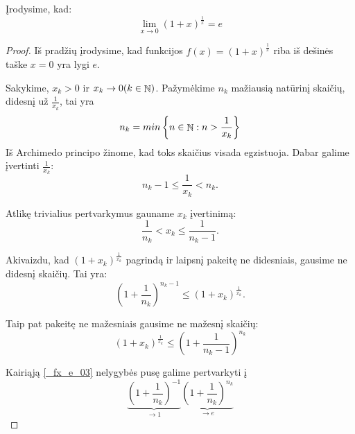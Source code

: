\begin{exmp}
  Įrodysime, kad:
  \begin{equation}
    \lim _{x \to 0} (1 + x)^{\frac{1}{x}} = e
    \label{_fx_e_01}
  \end{equation}

  \begin{proof}

    Iš pradžių įrodysime, kad funkcijos $f(x) = (1 + x)^{\frac{1}{x}}$ 
    riba iš dešinės taške $x = 0$ yra lygi $e$.

    Sakykime, $x_k > 0$ ir $x_k \to 0 (k \in \mathop{\mathbb{N}})$. Pažymėkime $n_k$ 
    mažiausią natūrinį skaičių, didesnį už $\frac{1}{x_k}$, tai yra 
    \begin{equation*}
      n_{k} = min \left\{ n \in \mathop{\mathbb{N}} : n > \frac{1}{x_{k}} \right\}
    \end{equation*}
    Iš Archimedo principo žinome, kad toks skaičius visada egzistuoja.
    Dabar galime įvertinti $\frac{1}{x_k}$:
    \begin{equation*}
      n_k - 1 \leq \frac{1}{x_k} < n_k.
    \end{equation*}

    Atlikę trivialius pertvarkymus gauname $x_k$ įvertinimą:
    \begin{equation*}
      \frac{1}{n_{k}} < x_k \leq \frac{1}{n_{k} - 1}.
    \end{equation*}

    Akivaizdu, kad $(1 + x_{k})^\frac{1}{x_{k}}$ pagrindą ir laipsnį 
    pakeitę ne didesniais, gausime ne didesnį skaičių. Tai yra:
    \begin{equation}
      \left( 1 + \frac{1}{n_{k}} \right)^{n_{k} - 1}
      \leq (1 + x_{k})^\frac{1}{x_{k}}.
      \label{_fx_e_03}
    \end{equation}

    Taip pat pakeitę ne mažesniais gausime ne mažesnį skaičių:
    \begin{equation}
      (1 + x_{k})^{\frac{1}{x_{k}}} 
      \leq \left( 1 + \frac{1}{n_{k} - 1} \right)^{n_{k}}
      \label{_fx_e_04}
    \end{equation}

    Kairiąją \ref{_fx_e_03} nelygybės pusę galime pertvarkyti į 
    \begin{equation}
      \underbrace{\left( 1 + \frac{1}{n_{k}} \right)^{-1}}_{\to 1}
      \underbrace{\left( 1 + \frac{1}{n_{k}} \right)^{n_{k}}}_{\to e}
      \label{_fx_e_05}
    \end{equation}


\end{proof}
\end{exmp}
